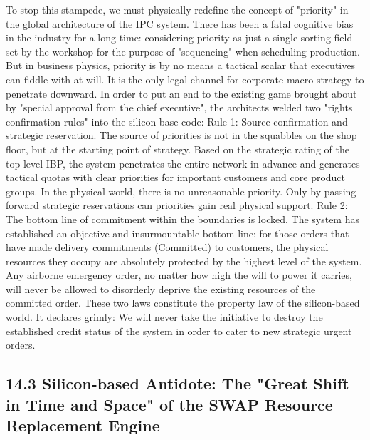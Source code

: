 \documentclass[11pt,a4paper]{article}
\begin{document}
To stop this stampede, we must physically redefine the concept of "priority" in the global architecture of the IPC system. There has been a fatal cognitive bias in the industry for a long time: considering priority as just a single sorting field set by the workshop for the purpose of "sequencing" when scheduling production. But in business physics, priority is by no means a tactical scalar that executives can fiddle with at will. It is the only legal channel for corporate macro-strategy to penetrate downward. In order to put an end to the existing game brought about by "special approval from the chief executive", the architects welded two "rights confirmation rules" into the silicon base code: Rule 1: Source confirmation and strategic reservation. The source of priorities is not in the squabbles on the shop floor, but at the starting point of strategy. Based on the strategic rating of the top-level IBP, the system penetrates the entire network in advance and generates tactical quotas with clear priorities for important customers and core product groups. In the physical world, there is no unreasonable priority. Only by passing forward strategic reservations can priorities gain real physical support. Rule 2: The bottom line of commitment within the boundaries is locked. The system has established an objective and insurmountable bottom line: for those orders that have made delivery commitments (Committed) to customers, the physical resources they occupy are absolutely protected by the highest level of the system. Any airborne emergency order, no matter how high the will to power it carries, will never be allowed to disorderly deprive the existing resources of the committed order. These two laws constitute the property law of the silicon-based world. It declares grimly: We will never take the initiative to destroy the established credit status of the system in order to cater to new strategic urgent orders.


\subsection*{14.3 Silicon-based Antidote: The "Great Shift in Time and Space" of the SWAP Resource Replacement Engine}
\end{document}
